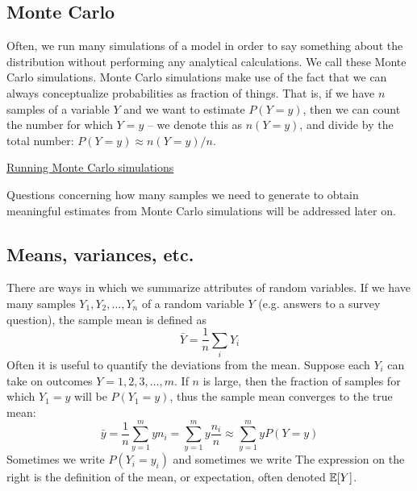 \subsection{Monte Carlo}
Often, we run many simulations of a model in order to say something about the distribution without performing any analytical calculations. We call these {\dfn Monte Carlo} simulations. Monte Carlo simulations make use of the fact that we can always conceptualize probabilities as fraction of things. That is, if we have $n$ samples of a variable $Y$ and we want to estimate $P(Y=y)$, then we can count the number for which $Y=y$ -- we denote this as $n(Y=y)$, and divide by the total number: $P(Y=y) \approx n(Y=y)/n$. 
\begin{example}
\href{https://colab.research.google.com/drive/1Gs-gSsUP1hHVwhrbwvWzLVm1ulcLJKRI#scrollTo=n7vN0l4PWbbX}{Running Monte Carlo simulations}
\end{example}
Questions concerning how many samples we need to generate to obtain meaningful estimates from Monte Carlo simulations will be addressed later on. 







\subsection{Means,  variances, etc.}
There are ways in which we summarize attributes of random variables.
If we have many samples $Y_1,Y_2,\dots,Y_n$ of a random variable $Y$ (e.g. answers to a survey question), the {\dfn sample mean} is defined as
\begin{equation}
\bar{Y} = \frac{1}{n}\sum_{i}Y_i
\end{equation}
 Often it is useful to quantify the deviations from the mean. Suppose each $Y_i$ can take on outcomes $Y = 1,2,3,\dots,m$. If $n$ is large, then the fraction of samples for which $Y_1= y$ will be $P(Y_1=y)$, thus the sample mean converges to the true mean: 
 \begin{equation}
\bar{y} = \frac{1}{n} \sum_{y=1}^m y n_i=\sum_{y=1}^m y \frac{n_i }{n}\approx  \sum_{y=1}^m y P(Y=y)
\end{equation}
Sometimes we write $P(Y_i = y_i)$ and sometimes we write 
The expression on the right is the definition of the mean, or {\dfn expectation}, often denoted $\mathbb E[Y]$.



